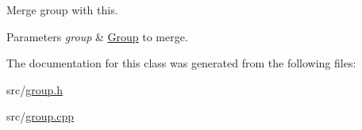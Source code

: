 \label{d0/db7/classGroup_a2aca17525330aeaf591e0bc243a8149e}
Merge group with this. 
\begin{DoxyParams}{Parameters}
{\em group} & \hyperlink{classGroup}{Group} to merge. \\
\hline
\end{DoxyParams}


The documentation for this class was generated from the following files:\begin{DoxyCompactItemize}
\item 
src/\hyperlink{group_8h}{group.h}\item 
src/\hyperlink{group_8cpp}{group.cpp}\end{DoxyCompactItemize}
